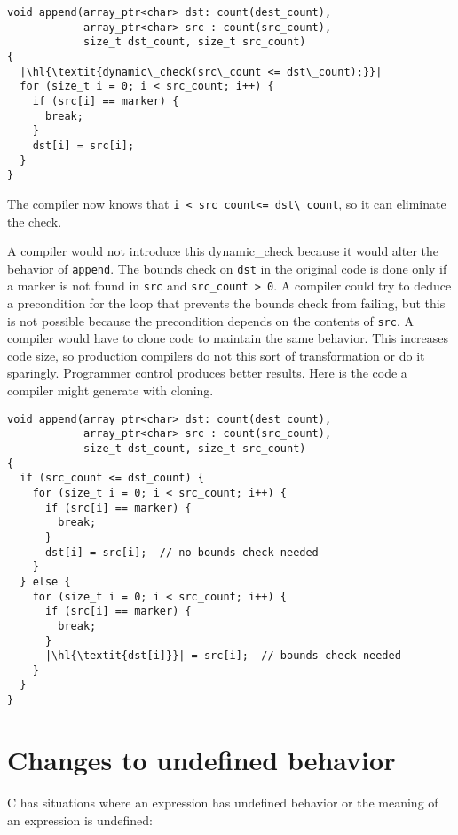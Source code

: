 \begin{lstlisting}[escapechar=\|]
void append(array_ptr<char> dst: count(dest_count),
            array_ptr<char> src : count(src_count),
            size_t dst_count, size_t src_count)
{
  |\hl{\textit{dynamic\_check(src\_count <= dst\_count);}}|
  for (size_t i = 0; i < src_count; i++) {
    if (src[i] == marker) {
      break;
    }
    dst[i] = src[i];
  }
}
\end{lstlisting}

The compiler now knows that \lstinline+i < src_count<= dst\_count+,
so it can eliminate the check.

A compiler would not introduce this dynamic\_check because it would
alter the behavior of \lstinline+append+. The bounds check on \lstinline+dst+
in the original code is done only if a marker is not found in
\lstinline+src+ and \lstinline+src_count > 0+. A compiler could
try to deduce a precondition for the loop 
that prevents the bounds check from failing, but this is
not possible because the precondition depends on the contents of
\lstinline+src+. A compiler would have to clone code to maintain the same
behavior. This increases code size, so production compilers do not this
sort of transformation or do it sparingly. Programmer control produces
better results.   Here is the code a compiler might generate with cloning.

\begin{lstlisting}[escapechar=\|]
void append(array_ptr<char> dst: count(dest_count), 
            array_ptr<char> src : count(src_count),
            size_t dst_count, size_t src_count)
{
  if (src_count <= dst_count) {
    for (size_t i = 0; i < src_count; i++) {
      if (src[i] == marker) {
        break;
      }
      dst[i] = src[i];  // no bounds check needed
    }
  } else {
    for (size_t i = 0; i < src_count; i++) {
      if (src[i] == marker) {
        break;
      }
      |\hl{\textit{dst[i]}}| = src[i];  // bounds check needed
    }
  }
}
\end{lstlisting}

\section{Changes to undefined behavior}
\label{section:changes-to-undefined-behavior}

C has situations where an expression has undefined behavior or the
meaning of an expression is undefined:

